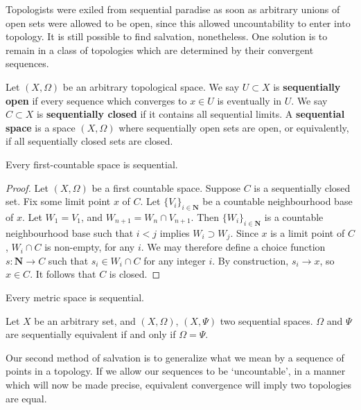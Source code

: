 Topologists were exiled from sequential paradise as soon as arbitrary unions of open sets were allowed to be open, since this allowed uncountability to enter into topology. It is still possible to find salvation, nonetheless. One solution is to remain in a class of topologies which are determined by their convergent sequences.

\begin{definition}
    Let $(X,\Omega)$ be an arbitrary topological space. We say $U \subset X$ is {\bf sequentially open} if every sequence which converges to $x \in U$ is eventually in $U$. We say $C \subset X$ is {\bf sequentially closed} if it contains all sequential limits. A {\bf sequential space} is a space $(X,\Omega)$ where sequentially open sets are open, or equivalently, if all sequentially closed sets are closed.
\end{definition}

\begin{lemma}
    Every first-countable space is sequential.
\end{lemma}
\begin{proof}
    Let $(X,\Omega)$ be a first countable space. Suppose $C$ is a sequentially closed set. Fix some limit point $x$ of $C$.  Let $\{ V_i \}_{i \in \mathbf{N}}$ be a countable neighbourhood base of $x$. Let $W_1 = V_1$, and $W_{n+1} = W_n \cap V_{n+1}$. Then $\{ W_i \}_{i \in \mathbf{N}}$ is a countable neighbourhood base such that $i < j$ implies $W_i \supset W_j$. Since $x$ is a limit point of $C$, $W_i \cap C$ is non-empty, for any $i$. We may therefore define a choice function $s: \mathbf{N} \to C$ such that $s_i \in W_i \cap C$ for any integer $i$. By construction, $s_i \to x$, so $x \in C$. It follows that $C$ is closed.
\end{proof}

\begin{corollary}
    Every metric space is sequential.
\end{corollary}

\begin{exercise}
    Let $X$ be an arbitrary set, and $(X, \Omega)$, $(X, \Psi)$ two sequential spaces. $\Omega$ and $\Psi$ are sequentially equivalent if and only if $\Omega = \Psi$.
\end{exercise}

Our second method of salvation is to generalize what we mean by a sequence of points in a topology. If we allow our sequences to be `uncountable', in a manner which will now be made precise, equivalent convergence will imply two topologies are equal.

